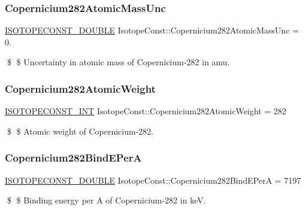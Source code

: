 \subsubsection{\texorpdfstring{Copernicium282\+Atomic\+Mass\+Unc}{Copernicium282AtomicMassUnc}}
{\footnotesize\ttfamily \mbox{\hyperlink{group___isotope_const-_macros_ga8f45a7272ce02c0b4c65c44636ed719a}{I\+S\+O\+T\+O\+P\+E\+C\+O\+N\+S\+T\+\_\+\+D\+O\+U\+B\+LE}} Isotope\+Const\+::\+Copernicium282\+Atomic\+Mass\+Unc = 0.}

\$ \$ Uncertainty in atomic mass of Copernicium-\/282 in amu. \mbox{\label{group___isotope_const-_copernicium-_cn282_gab3039425da37e49a09f02d7b37d89286}} 
\subsubsection{\texorpdfstring{Copernicium282\+Atomic\+Weight}{Copernicium282AtomicWeight}}
{\footnotesize\ttfamily \mbox{\hyperlink{group___isotope_const-_macros_ga5f18360b3e99483a35c32d789e62621c}{I\+S\+O\+T\+O\+P\+E\+C\+O\+N\+S\+T\+\_\+\+I\+NT}} Isotope\+Const\+::\+Copernicium282\+Atomic\+Weight = 282}

\$ \$ Atomic weight of Copernicium-\/282. \mbox{\label{group___isotope_const-_copernicium-_cn282_ga5c492859d2270b4bc5a5016104327f78}} 
\subsubsection{\texorpdfstring{Copernicium282\+Bind\+E\+PerA}{Copernicium282BindEPerA}}
{\footnotesize\ttfamily \mbox{\hyperlink{group___isotope_const-_macros_ga8f45a7272ce02c0b4c65c44636ed719a}{I\+S\+O\+T\+O\+P\+E\+C\+O\+N\+S\+T\+\_\+\+D\+O\+U\+B\+LE}} Isotope\+Const\+::\+Copernicium282\+Bind\+E\+PerA = 7197}

\$ \$ Binding energy per A of Copernicium-\/282 in keV. \mbox{\label{group___isotope_const-_copernicium-_cn282_ga3972db780670ec4d1b4bd56b8cf9f6d2}} 
